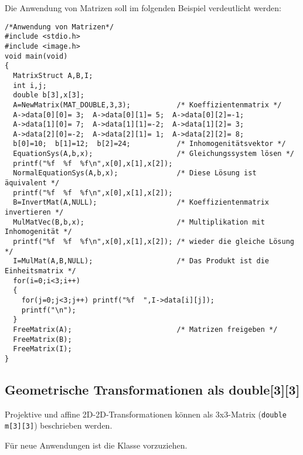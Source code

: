 Die Anwendung von Matrizen soll im folgenden Beispiel verdeutlicht werden:
\begprogr\begin{verbatim}
/*Anwendung von Matrizen*/
#include <stdio.h>
#include <image.h>
void main(void)
{
  MatrixStruct A,B,I;
  int i,j;
  double b[3],x[3];
  A=NewMatrix(MAT_DOUBLE,3,3);           /* Koeffizientenmatrix */
  A->data[0][0]= 3;  A->data[0][1]= 5;  A->data[0][2]=-1;
  A->data[1][0]= 7;  A->data[1][1]=-2;  A->data[1][2]= 3;
  A->data[2][0]=-2;  A->data[2][1]= 1;  A->data[2][2]= 8;
  b[0]=10;  b[1]=12;  b[2]=24;           /* Inhomogenitätsvektor */
  EquationSys(A,b,x);                    /* Gleichungssystem lösen */
  printf("%f  %f  %f\n",x[0],x[1],x[2]);
  NormalEquationSys(A,b,x);              /* Diese Lösung ist äquivalent */
  printf("%f  %f  %f\n",x[0],x[1],x[2]);
  B=InvertMat(A,NULL);                   /* Koeffizientenmatrix invertieren */
  MulMatVec(B,b,x);                      /* Multiplikation mit Inhomogenität */
  printf("%f  %f  %f\n",x[0],x[1],x[2]); /* wieder die gleiche Lösung */
  I=MulMat(A,B,NULL);                    /* Das Produkt ist die Einheitsmatrix */
  for(i=0;i<3;i++)
  { 
    for(j=0;j<3;j++) printf("%f  ",I->data[i][j]);
    printf("\n");
  }
  FreeMatrix(A);                         /* Matrizen freigeben */
  FreeMatrix(B);
  FreeMatrix(I);
} 
\end{verbatim}\endprogr

\subsection{Geometrische Transformationen als double[3][3]}
Projektive und affine 2D-2D-Transformationen können als 3x3-Matrix
(\verb+double m[3][3]+) beschrieben werden.
 
Für neue Anwendungen ist die Klasse  vorzuziehen.

